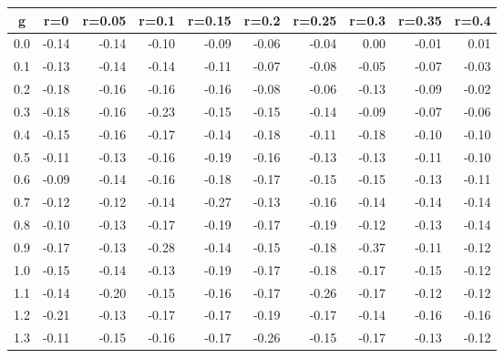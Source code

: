%
\begin{table}[!tbp]
 \begin{center}
 \begin{tabular}{rrrrrrrrrr}\hline\hline
\multicolumn{1}{c}{g}&\multicolumn{1}{c}{r=0}&\multicolumn{1}{c}{r=0.05}&\multicolumn{1}{c}{r=0.1}&\multicolumn{1}{c}{r=0.15}&\multicolumn{1}{c}{r=0.2}&\multicolumn{1}{c}{r=0.25}&\multicolumn{1}{c}{r=0.3}&\multicolumn{1}{c}{r=0.35}&\multicolumn{1}{c}{r=0.4}\tabularnewline
\hline
0.0&-0.14&-0.14&-0.10&-0.09&-0.06&-0.04& 0.00&-0.01& 0.01\tabularnewline
0.1&-0.13&-0.14&-0.14&-0.11&-0.07&-0.08&-0.05&-0.07&-0.03\tabularnewline
0.2&-0.18&-0.16&-0.16&-0.16&-0.08&-0.06&-0.13&-0.09&-0.02\tabularnewline
0.3&-0.18&-0.16&-0.23&-0.15&-0.15&-0.14&-0.09&-0.07&-0.06\tabularnewline
0.4&-0.15&-0.16&-0.17&-0.14&-0.18&-0.11&-0.18&-0.10&-0.10\tabularnewline
0.5&-0.11&-0.13&-0.16&-0.19&-0.16&-0.13&-0.13&-0.11&-0.10\tabularnewline
0.6&-0.09&-0.14&-0.16&-0.18&-0.17&-0.15&-0.15&-0.13&-0.11\tabularnewline
0.7&-0.12&-0.12&-0.14&-0.27&-0.13&-0.16&-0.14&-0.14&-0.14\tabularnewline
0.8&-0.10&-0.13&-0.17&-0.19&-0.17&-0.19&-0.12&-0.13&-0.14\tabularnewline
0.9&-0.17&-0.13&-0.28&-0.14&-0.15&-0.18&-0.37&-0.11&-0.12\tabularnewline
1.0&-0.15&-0.14&-0.13&-0.19&-0.17&-0.18&-0.17&-0.15&-0.12\tabularnewline
1.1&-0.14&-0.20&-0.15&-0.16&-0.17&-0.26&-0.17&-0.12&-0.12\tabularnewline
1.2&-0.21&-0.13&-0.17&-0.17&-0.19&-0.17&-0.14&-0.16&-0.16\tabularnewline
1.3&-0.11&-0.15&-0.16&-0.17&-0.26&-0.15&-0.17&-0.13&-0.12\tabularnewline
\hline
\end{tabular}

\end{center}

\end{table}

